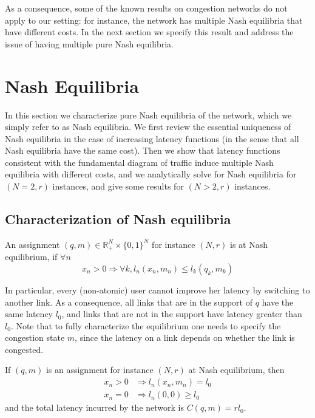As a consequence, some of the known results on congestion networks do not apply to our setting: for instance, the network has multiple Nash equilibria that have different costs. In the next section we specify this result and address the issue of having multiple pure Nash equilibria.



\section{Nash Equilibria}
\label{sec:nash_equilibria}
In this section we characterize pure Nash equilibria of the network, which we simply refer to as Nash equilibria. We first review the essential uniqueness of Nash equilibria in the case of increasing latency functions (in the sense that all Nash equilibria have the same cost). Then we show that latency functions consistent with the fundamental diagram of traffic induce multiple Nash equilibria with different costs, and we analytically solve for Nash equilibria for $(N = 2, r)$ instances, and give some results for $(N>2, r)$ instances.

\subsection{Characterization of Nash equilibria}

\begin{definition}
An assignment $(q, m) \in \mathbb{R}_+^N \times \{0, 1\}^N$ for instance $(N, r)$ is at Nash equilibrium, if $\forall n$
\[
x_n > 0 \Rightarrow \forall k, l_n(x_n, m_n) \leq l_k(q_k, m_k)
\]
\end{definition}

In particular, every (non-atomic) user cannot improve her latency by switching to another link. As a consequence, all links that are in the support of $q$ have the same latency $l_0$, and links that are not in the support have latency greater than $l_0$. Note that to fully characterize the equilibrium one needs to specify the congestion state $m$, since the latency on a link depends on whether the link is congested.

\begin{lemma}
\label{lemma:nash_eq}
If $(q, m)$ is an assignment for instance $(N, r)$ at Nash equilibrium, then
\begin{align*}
x_n >0 &\Rightarrow l_n(x_n, m_n) = l_0\\
x_n = 0 &\Rightarrow l_n(0, 0) \geq l_0
\end{align*}
and the total latency incurred by the network is $C(q, m) = r l_0$.
\end{lemma}

